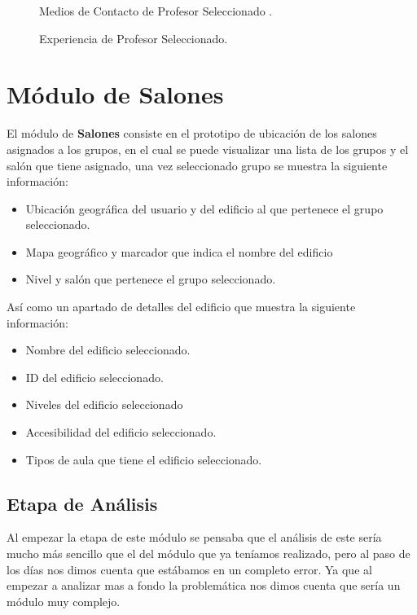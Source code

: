 \begin{figure}[h!]
	\begin{center}
		\caption{Medios de Contacto de Profesor Seleccionado .}
		\label{p3}
	\end{center}
\end{figure}

\begin{figure}[h!]
	\begin{center}
		\caption{Experiencia de Profesor Seleccionado.}
		\label{p2}
	\end{center}
\end{figure}


\section{Módulo de Salones}
El módulo de \textbf{Salones} consiste en el prototipo de ubicación de los salones asignados a los grupos, en el cual se puede visualizar una lista de los grupos y el salón que tiene asignado, una vez seleccionado grupo se muestra la siguiente información:
\begin{itemize}
	\item Ubicación geográfica del usuario y del edificio al que pertenece el grupo seleccionado.
	\item Mapa geográfico y marcador que indica el nombre del edificio
	\item Nivel y salón que pertenece el grupo seleccionado.
\end{itemize}  
Así como un apartado de detalles del edificio que muestra la siguiente información:
\begin{itemize}
	\item Nombre del edificio seleccionado.
	\item ID del edificio seleccionado.
	\item Niveles del edificio seleccionado
	\item Accesibilidad del edificio seleccionado.
	\item Tipos de aula que tiene el edificio seleccionado.
\end{itemize}
\subsection{Etapa de Análisis}
Al empezar la etapa de este módulo se pensaba que el análisis de este sería mucho más sencillo que el del módulo que ya teníamos realizado, pero al paso de los días nos dimos cuenta que estábamos en un completo error. Ya que al empezar a analizar mas a fondo la problemática nos dimos cuenta que sería un módulo muy complejo.\\


